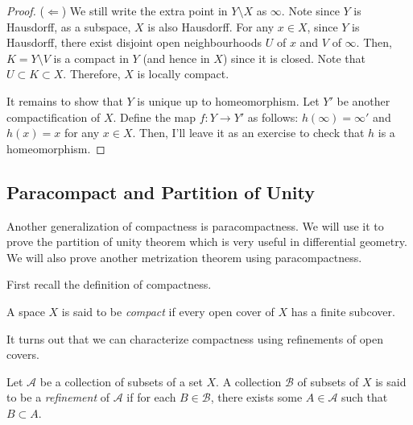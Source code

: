 \begin{proof}
    (\(\Leftarrow\)) We still write the extra point in $Y\setminus X$ as $\infty$. Note since $Y$ is Hausdorff, as a subspace, $X$ is also Hausdorff. For any $x\in X$, since $Y$ is Hausdorff, there exist disjoint open neighbourhoods $U$ of $x$ and $V$ of $\infty$. Then, $K=Y\setminus V$ is a compact in $Y$ (and hence in $X$) since it is closed. Note that $U\subset K\subset X$. Therefore, $X$ is locally compact. 

    It remains to show that $Y$ is unique up to homeomorphism. Let $Y'$ be another compactification of $X$. Define the map $f:Y\to Y'$ as follows: $h(\infty)=\infty'$ and $h(x)=x$ for any $x\in X$. Then, I'll leave it as an exercise to check that $h$ is a homeomorphism.
\end{proof}

    

    

\subsection{Paracompact and Partition of Unity}

Another generalization of compactness is paracompactness. We will use it to prove the partition of unity theorem which is very useful in differential geometry. We will also prove another metrization theorem using paracompactness.



First recall the definition of compactness.

\begin{definition}
    A space \(X\) is said to be \emph{compact} if every open cover of \(X\) has a finite subcover.
\end{definition}

It turns out that we can characterize compactness using refinements of open covers.
\begin{definition}
    Let $\mathcal{A}$ be a collection of subsets of a set $X$. A collection $\mathcal{B}$ of subsets of $X$ is said to be a \emph{refinement} of $\mathcal{A}$ if for each $B\in \mathcal{B}$, there exists some $A\in \mathcal{A}$ such that $B\subset A$.
\end{definition}

